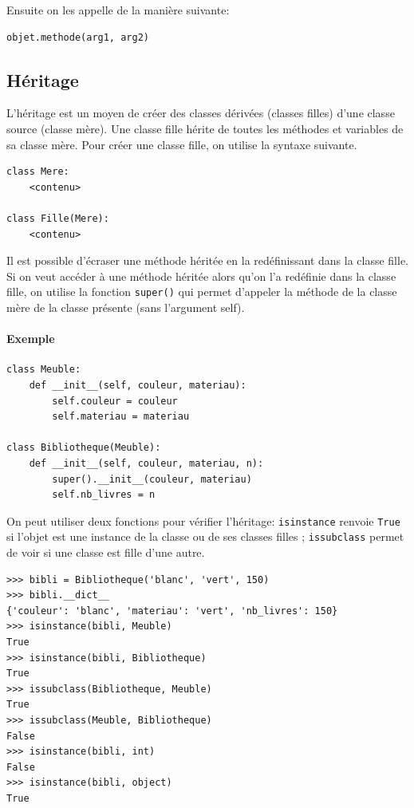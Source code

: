 \documentclass[a4paper, 10pt]{article}
\newcommand{\code}[1]{{\small\texttt{#1}}}
\begin{document}
Ensuite on les appelle de la manière suivante:
\begin{verbatim}
objet.methode(arg1, arg2)
\end{verbatim}


\subsection{Héritage}

L'héritage est un moyen de créer des classes dérivées (classes filles) d'une classe source (classe mère). Une classe fille hérite de toutes les méthodes et variables de sa classe mère. Pour créer une classe fille, on utilise la syntaxe suivante.

\begin{verbatim}
class Mere:
    <contenu>

class Fille(Mere):
    <contenu>
\end{verbatim}

Il est possible d'écraser une méthode héritée en la redéfinissant dans la classe fille. Si on veut accéder à une méthode héritée alors qu'on l'a redéfinie dans la classe fille, on utilise la fonction \code{super()} qui permet d'appeler la méthode de la classe mère de la classe présente (sans l'argument self).

\paragraph{Exemple}
\begin{verbatim}
class Meuble:
    def __init__(self, couleur, materiau):
        self.couleur = couleur
        self.materiau = materiau

class Bibliotheque(Meuble):
    def __init__(self, couleur, materiau, n):
        super().__init__(couleur, materiau)
        self.nb_livres = n
\end{verbatim}
On peut utiliser deux fonctions pour vérifier l'héritage: \code{isinstance} renvoie \code{True} si l'objet est une instance de la classe ou de ses classes filles ; \code{issubclass} permet de voir si une classe est fille d'une autre.

\begin{Verbatim}[frame = single, fontsize = \footnotesize]
>>> bibli = Bibliotheque('blanc', 'vert', 150)
>>> bibli.__dict__
{'couleur': 'blanc', 'materiau': 'vert', 'nb_livres': 150}
>>> isinstance(bibli, Meuble)
True
>>> isinstance(bibli, Bibliotheque)
True
>>> issubclass(Bibliotheque, Meuble)
True
>>> issubclass(Meuble, Bibliotheque)
False
>>> isinstance(bibli, int)
False
>>> isinstance(bibli, object)
True
\end{Verbatim}
\end{document}
